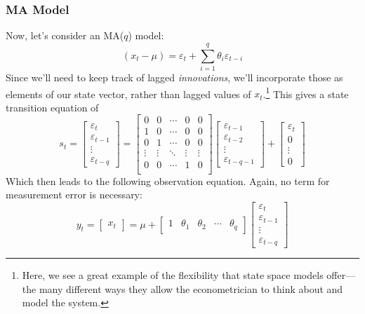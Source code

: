 \documentclass[a4paper,12pt]{article}
\begin{document}
\subsubsection{MA Model}

Now, let's consider an MA($q$) model: 
\[
  (x_t - \mu) = \varepsilon_t 
  + \sum^q_{i=1} \theta_i  \varepsilon_{t-i}
\]
Since we'll need to keep track of lagged \emph{innovations}, we'll incorporate those as elements of our state vector, rather than lagged values of $x_t$.\footnote{Here, we see a great example of the flexibility that state space models offer---the many different ways they allow the econometrician to think about and model the system.} This gives a state transition equation of 
\[
  s_t = 
  \begin{bmatrix}
  \varepsilon_t \\ \varepsilon_{t-1} \\
  \vdots \\ \varepsilon_{t-q}
  \end{bmatrix}
  = \begin{bmatrix}
  0 & 0 & \cdots & 0 & 0 \\
  1 & 0 & \cdots & 0 & 0\\
  0 & 1 & \cdots & 0 & 0\\
  \vdots & \vdots & \ddots & \vdots & \vdots\\
  0 & 0 & \cdots & 1 & 0\\ 
  \end{bmatrix}
  \begin{bmatrix}
  \varepsilon_{t-1} \\ \varepsilon_{t-2} \\
  \vdots \\ \varepsilon_{t-q-1}
  \end{bmatrix}  
  + \begin{bmatrix}
  \varepsilon_t \\ 0 \\ \vdots \\ 0 
  \end{bmatrix}
\]
Which then leads to the following observation equation. Again, no term for measurement error is necessary:
\[
  y_t = 
  \begin{bmatrix} x_t \end{bmatrix}
  = \mu +  
  \begin{bmatrix} 1 & \theta_1 & \theta_2 & \cdots &
    \theta_q \end{bmatrix}
  \begin{bmatrix}
  \varepsilon_t \\ \varepsilon_{t-1} \\
  \vdots \\ \varepsilon_{t-q}
  \end{bmatrix}
\]
\end{document}
